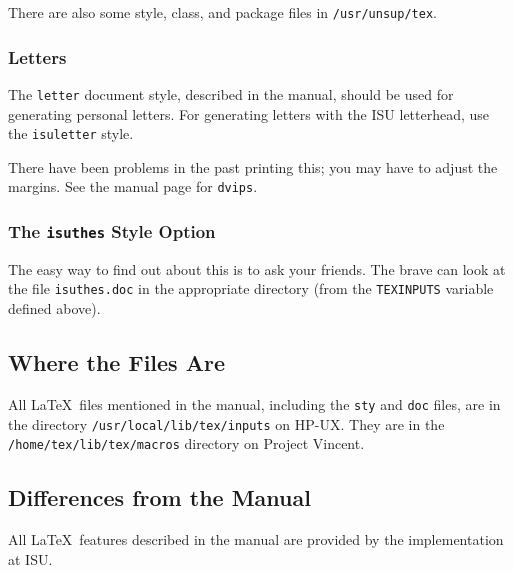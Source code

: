 \documentclass{article}
\begin{document}
There are also some style, class, and package
files in {\tt /usr/unsup/tex}.

\subsubsection{Letters} \label{sec:letters}

The \mbox{\tt letter} document style, described in the manual, should
be used for generating personal letters.  For generating letters with the
ISU letterhead, use the \mbox{\tt isuletter} style.

There have been problems in the past printing this;
you may have to adjust the margins.
See the manual page for {\tt dvips}.

\subsubsection{The {\tt isuthes} Style Option}

The easy way to find out about this is to ask your friends.
The brave can look at the file {\tt isuthes.doc} in the appropriate
directory (from the {\tt TEXINPUTS} variable defined above).


\subsection{Where the Files Are}

%

All \LaTeX\ files mentioned in the manual, including the {\tt sty} and
{\tt doc} files, are in the directory \mbox{\tt /usr/local/lib/tex/inputs}
on HP-UX.  They are in the  \mbox{\tt /home/tex/lib/tex/macros} directory
on Project Vincent.


\subsection{Differences from the Manual}

All \LaTeX\ features described in the manual are provided by 
the implementation at ISU.


\end{document}
